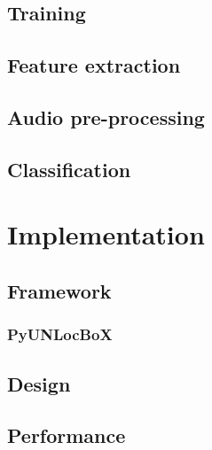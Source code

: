 \documentclass[a4paper,12pt,twoside]{report}
\begin{document}
\section{Training}

\section{Feature extraction}

\section{Audio pre-processing}

\section{Classification}

\chapter{Implementation}

\section{Framework}

\subsection{PyUNLocBoX}

\section{Design}

\section{Performance}
\end{document}
